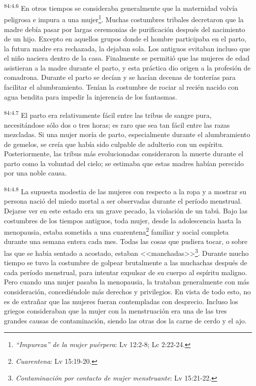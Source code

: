 \par
\textsuperscript{84:4.6} En otros tiempos se consideraba generalmente que la maternidad volvía peligrosa e impura a una mujer\footnote{\textit{``Impureza'' de la mujer puérpera}: Lv 12:2-8; Lc 2:22-24.}. Muchas costumbres tribales decretaron que la madre debía pasar por largas ceremonias de purificación después del nacimiento de un hijo. Excepto en aquellos grupos donde el hombre participaba en el parto, la futura madre era rechazada, la dejaban sola. Los antiguos evitaban incluso que el niño naciera dentro de la casa. Finalmente se permitió que las mujeres de edad asistieran a la madre durante el parto, y esta práctica dio origen a la profesión de comadrona. Durante el parto se decían y se hacían decenas de tonterías para facilitar el alumbramiento. Tenían la costumbre de rociar al recién nacido con agua bendita para impedir la injerencia de los fantasmas.

\par
\textsuperscript{84:4.7} El parto era relativamente fácil entre las tribus de sangre pura, necesitándose sólo dos o tres horas; es raro que sea tan fácil entre las razas mezcladas. Si una mujer moría de parto, especialmente durante el alumbramiento de gemelos, se creía que había sido culpable de adulterio con un espíritu. Posteriormente, las tribus más evolucionadas consideraron la muerte durante el parto como la voluntad del cielo; se estimaba que estas madres habían perecido por una noble causa.

\par
\textsuperscript{84:4.8} La supuesta modestia de las mujeres con respecto a la ropa y a mostrar su persona nació del miedo mortal a ser observadas durante el período menstrual. Dejarse ver en este estado era un grave pecado, la violación de un tabú. Bajo las costumbres de los tiempos antiguos, toda mujer, desde la adolescencia hasta la menopausia, estaba sometida a una cuarentena\footnote{\textit{Cuarentena}: Lv 15:19-20.} familiar y social completa durante una semana entera cada mes. Todas las cosas que pudiera tocar, o sobre las que se había sentado a acostado, estaban <<manchadas>>\footnote{\textit{Contaminación por contacto de mujer menstruante}: Lv 15:21-22.}. Durante mucho tiempo se tuvo la costumbre de golpear brutalmente a las muchachas después de cada período menstrual, para intentar expulsar de su cuerpo al espíritu maligno. Pero cuando una mujer pasaba la menopausia, la trataban generalmente con más consideración, concediéndole más derechos y privilegios. En vista de todo esto, no es de extrañar que las mujeres fueran contempladas con desprecio. Incluso los griegos consideraban que la mujer con la menstruación era una de las tres grandes causas de contaminación, siendo las otras dos la carne de cerdo y el ajo.

